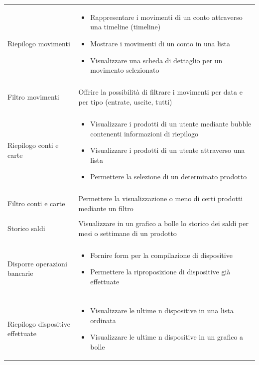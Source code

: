 \begin{center}
\begin{longtable}{p{6cm}|p{8cm}}
    Riepilogo movimenti & \begin{itemize}
                           \item Rappresentare i movimenti di un conto attraverso una timeline (timeline)
                           \item Mostrare i movimenti di un conto in una lista
                           \item Visualizzare una scheda di dettaglio per un movimento selezionato
                          \end{itemize}\\\\
    Filtro movimenti & Offrire la possibilità di filtrare i movimenti per data e per tipo (entrate, uscite, tutti)\\\\
    Riepilogo conti e carte & \begin{itemize}
				\item Visualizzare i prodotti di un utente mediante bubble contenenti informazioni di riepilogo
				\item Visualizzare i prodotti di un utente attraverso una lista
				\item Permettere la selezione di un determinato prodotto
                              \end{itemize}\\\\
    Filtro conti e carte & Permettere la visualizzazione o meno di certi prodotti mediante un filtro\\\\
    Storico saldi & Visualizzare in un grafico a bolle lo storico dei saldi per mesi o settimane di un prodotto\\\\
    Disporre operazioni bancarie & \begin{itemize}
				      \item Fornire form per la compilazione di dispositive 
				      \item Permettere la riproposizione di dispositive già effettuate
				    \end{itemize}\\\\
    Riepilogo dispositive effettuate & \begin{itemize}
                                        \item Visualizzare le ultime n dispositive in una lista ordinata
                                        \item Visualizzare le ultime n dispositive in un grafico a bolle

\end{itemize}
\end{longtable}
\end{center}
